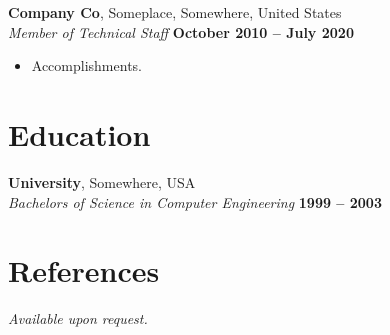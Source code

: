\documentclass[margin,line,11pt]{resume}
\begin{document}
\begin{resume}
    \textbf{Company Co}, Someplace, Somewhere, United States \vspace{2mm}\\\vspace{1mm}%
    \textsl{Member of Technical Staff} \hfill \textbf{October 2010 -- July 2020}\\
	\begin{itemize}
        \item Accomplishments.
	\end{itemize}

    \section{\mysidestyle Education}

    \textbf{University}, Somewhere, USA \\
    \textsl{Bachelors of Science in Computer Engineering} \hfill \textbf{ 1999 -- 2003 }\\

    \section{\mysidestyle References}
    {\sl Available upon request.}

\end{resume}
\end{document}
